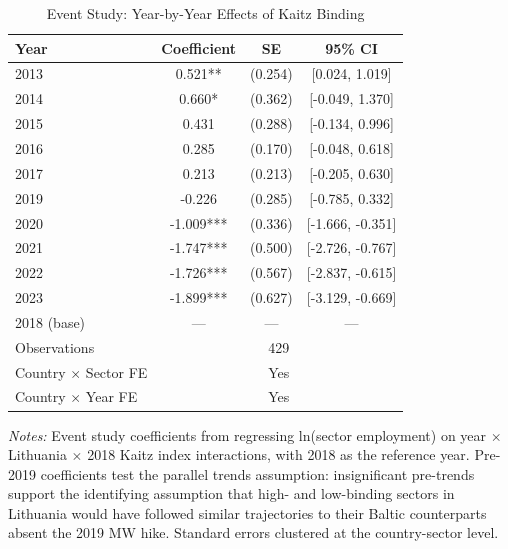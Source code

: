 \begin{table}[H]
\centering
\caption{Event Study: Year-by-Year Effects of Kaitz Binding}
\label{tab:event}
\begin{threeparttable}
\begin{tabular}{lccc}
\toprule
Year & Coefficient & SE & 95\% CI \\
\midrule
2013 & 0.521** & (0.254) & [0.024, 1.019] \\
2014 & 0.660* & (0.362) & [-0.049, 1.370] \\
2015 & 0.431 & (0.288) & [-0.134, 0.996] \\
2016 & 0.285 & (0.170) & [-0.048, 0.618] \\
2017 & 0.213 & (0.213) & [-0.205, 0.630] \\
2019 & -0.226 & (0.285) & [-0.785, 0.332] \\
2020 & -1.009*** & (0.336) & [-1.666, -0.351] \\
2021 & -1.747*** & (0.500) & [-2.726, -0.767] \\
2022 & -1.726*** & (0.567) & [-2.837, -0.615] \\
2023 & -1.899*** & (0.627) & [-3.129, -0.669] \\
\midrule
2018 (base) & --- & --- & --- \\
\midrule
Observations & \multicolumn{3}{c}{429} \\
Country $\times$ Sector FE & \multicolumn{3}{c}{Yes} \\
Country $\times$ Year FE & \multicolumn{3}{c}{Yes} \\
\bottomrule
\end{tabular}
\begin{tablenotes}[flushleft]
\small
\item \textit{Notes:} Event study coefficients from regressing ln(sector employment) on year $\times$ Lithuania $\times$ 2018 Kaitz index interactions, with 2018 as the reference year. Pre-2019 coefficients test the parallel trends assumption: insignificant pre-trends support the identifying assumption that high- and low-binding sectors in Lithuania would have followed similar trajectories to their Baltic counterparts absent the 2019 MW hike. Standard errors clustered at the country-sector level.
\end{tablenotes}
\end{threeparttable}
\end{table}
